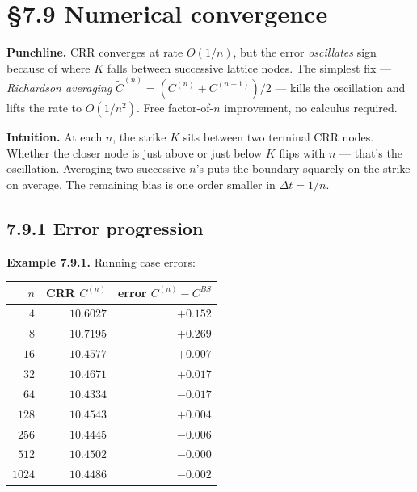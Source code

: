 \documentclass[
  10pt,
  twoside]{book}
\newcounter{none} %
\begin{document}
\section{§7.9 Numerical convergence}\label{numerical-convergence}

\textbf{Punchline.} CRR converges at rate \(O(1/n)\), but the error
\emph{oscillates} sign because of where \(K\) falls between successive
lattice nodes. The simplest fix --- \emph{Richardson averaging}
\(\tilde C^{(n)} = (C^{(n)} + C^{(n+1)})/2\) --- kills the oscillation
and lifts the rate to \(O(1/n^2)\). Free factor-of-\(n\) improvement, no
calculus required.

\textbf{Intuition.} At each \(n\), the strike \(K\) sits between two
terminal CRR nodes. Whether the closer node is just above or just below
\(K\) flips with \(n\) --- that's the oscillation. Averaging two
successive \(n\)'s puts the boundary squarely on the strike on average.
The remaining bias is one order smaller in \(\Delta t = 1/n\).

\subsection{7.9.1 Error progression}\label{error-progression}

\textbf{Example 7.9.1.} Running case errors:

{\def\LTcaptype{none} %
\begin{table}[H]
\centering
\begin{tabular}{|r|r|r|}
\toprule
\(n\) & CRR \(C^{(n)}\) & error \(C^{(n)} - C^{BS}\) \\
\midrule



\(\phantom{000}4\) & \(10.6027\) & \(+0.152\) \\
\(\phantom{000}8\) & \(10.7195\) & \(+0.269\) \\
\(\phantom{00}16\) & \(10.4577\) & \(+0.007\) \\
\(\phantom{00}32\) & \(10.4671\) & \(+0.017\) \\
\(\phantom{00}64\) & \(10.4334\) & \(-0.017\) \\
\(\phantom{0}128\) & \(10.4543\) & \(+0.004\) \\
\(\phantom{0}256\) & \(10.4445\) & \(-0.006\) \\
\(\phantom{0}512\) & \(10.4502\) & \(-0.000\) \\
\(1024\) & \(10.4486\) & \(-0.002\) \\
\bottomrule
\end{tabular}
\end{table}
}
\end{document}
